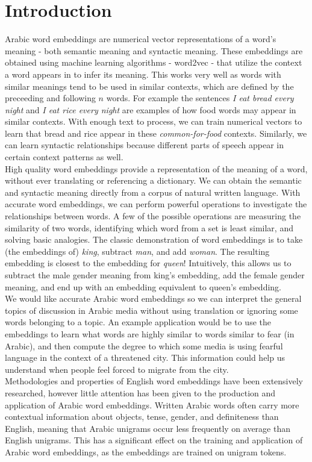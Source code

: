 \section{Introduction}


Arabic word embeddings are numerical vector representations of a word's meaning - both semantic meaning and syntactic meaning. These embeddings are obtained using machine learning algorithms - word2vec - that utilize the context a word appears in to infer its meaning. This works very well as words with similar meanings tend to be used in similar contexts, which are defined by the preceeding and following $n$ words. For example the sentences \textit{I eat bread every night} and \textit{I eat rice every night} are examples of how food words may appear in similar contexts. With enough text to process, we can train numerical vectors to learn that bread and rice appear in these \textit{common-for-food} contexts. Similarly, we can learn syntactic relationships because different parts of speech appear in certain context patterns as well.
\\
High quality word embeddings provide a representation of the meaning of a word, without ever translating or referencing a dictionary. We can obtain the semantic and syntactic meaning directly from a corpus of natural written language. With accurate word embeddings, we can perform powerful operations to investigate the relationships between words. A few of the possible operations are measuring the similarity of two words, identifying which word from a set is least similar, and solving basic analogies. The classic demonstration of word embeddings is to take (the embeddings of) \textit{king}, subtract \textit{man}, and add \textit{woman}. The resulting embedding is closest to the embedding for \textit{queen}! Intuitively, this allows us to subtract the male gender meaning from king's embedding, add the female gender meaning, and end up with an embedding equivalent to queen's embedding.
\\
We would like accurate Arabic word embeddings so we can interpret the general topics of discussion in Arabic media without using translation or ignoring some words belonging to a topic. An example application would be to use the embeddings to learn what words are highly similar to words similar to fear (in Arabic), and then compute the degree to which some media is using fearful language in the context of a threatened city. This information could help us understand when people feel forced to migrate from the city.
\\
Methodologies and properties of English word embeddings have been extensively researched, however little attention has been given to the production and application of Arabic word embeddings. Written Arabic words often carry more contextual information about objects, tense, gender, and definiteness than English, meaning that Arabic unigrams occur less frequently on average than English unigrams. This has a significant effect on the training and application of Arabic word embeddings, as the embeddings are trained on unigram tokens.